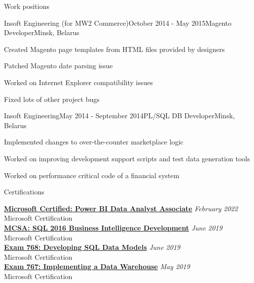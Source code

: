 \documentclass{resume} %
\begin{document}
\begin{rSection}{Work positions}
\begin{rSubsection}{Insoft Engineering (for MW2 Commerce)}{October 2014 - May 2015}{Magento Developer}{Minsk, Belarus}
\item Created Magento page templates from HTML files provided by designers
\item Patched Magento date parsing issue
\item Worked on Internet Explorer compatibility issues
\item Fixed lots of other project bugs
\end{rSubsection}

\begin{rSubsection}{Insoft Engineering}{May 2014 - September 2014}{PL/SQL DB Developer}{Minsk, Belarus}
\item Implemented changes to over-the-counter marketplace logic
\item Worked on improving development support scripts and test data generation tools
\item Worked on performance critical code of a financial system
\end{rSubsection}

\end{rSection}


\begin{rSection}{Certifications}

{\bf \href{https://www.credly.com/badges/021b4b7c-f370-4913-814c-64b6fa5ed9d5}{Microsoft Certified: Power BI Data Analyst Associate}} \hfill {\em February 2022} \\
Microsoft Certification \\

{\bf \href{https://www.youracclaim.com/badges/942bff46-1825-4cf0-8c1a-25221405a6cb}{MCSA: SQL 2016 Business Intelligence Development}} \hfill {\em June 2019} \\
Microsoft Certification \\

{\bf \href{https://www.youracclaim.com/badges/60b5faec-564d-4da6-a8c2-65762a36159e}{Exam 768: Developing SQL Data Models}} \hfill {\em June 2019} \\
Microsoft Certification \\

{\bf \href{https://www.youracclaim.com/badges/7405dcbe-59b0-42a4-804a-77c43f19341d}{Exam 767: Implementing a Data Warehouse}} \hfill {\em May 2019} \\
Microsoft Certification \\

\end{rSection}

\end{document}
